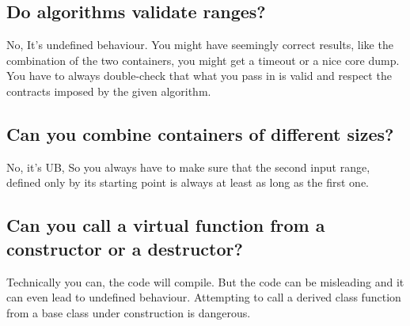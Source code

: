 \documentclass{report}
\begin{document}
\bigbreak \noindent 
\subsection{Do algorithms validate ranges?}
\bigbreak \noindent 
No, It's undefined behaviour. You might have seemingly correct
results, like the combination of the two containers, you might get
a timeout or a nice core dump. You have to always double-check that what you pass in is valid and
respect the contracts imposed by the given algorithm.

\bigbreak \noindent 
\subsection{Can you combine containers of different sizes?}
\bigbreak \noindent 
No, it's UB, So you always have to make sure that the second input range,
defined only by its starting point is always at least as long as the
first one.

\pagebreak 
{}
\bigbreak \noindent 
\subsection{Can you call a virtual function from a constructor or a destructor?}
\bigbreak \noindent 
Technically you can, the code will compile. But the code can be
misleading and it can even lead to undefined behaviour.
\bigbreak \noindent 
Attempting to call a derived class function from a base class under
construction is dangerous.

\bigbreak \noindent 
\end{document}
